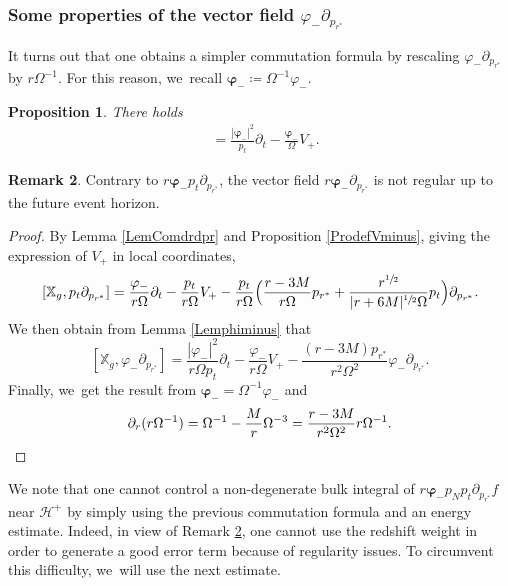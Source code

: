 \documentclass[JEP,XML,SOM,Unicode,published]{cedram}
\theoremstyle{plain}
\newtheorem{proposition}{Proposition}[section]
\theoremstyle{definition}
\newtheorem{remark}[proposition]{Remark}
\newcommand\T{{\mathbb{X}}}
\renewcommand\H{{\mathcal{H}^+}}
\begin{document}
\subsubsection{Some properties of the vector field $\varphi_- \partial_{p_{r^*}}$}

It turns out that one obtains a simpler commutation formula by rescaling $\varphi_- \partial_{p_{r^*}}$ by $r\Omega^{-1}$. For this reason, we~recall $\pmb{\varphi}_-\coloneqq\Omega^{-1} \varphi_-$.

\begin{proposition}\label{Propartialprstar}
There holds
\begin{align*}
[ \T_g, r\pmb{\varphi}_- \partial_{p_{r^*}}]&=\frac{|\pmb{\varphi}_-|^2}{ p_t} \partial_t-\frac{\pmb{\varphi}_-}{\Omega} V_+.
\end{align*}
\end{proposition}
\begin{remark}\label{Rkregu}
Contrary to $r\pmb{\varphi}_- p_t \partial_{p_{r^*}}$, the vector field $r\pmb{\varphi}_- \partial_{p_{r^*}}$ is not regular up to the future event horizon.
\end{remark}

\begin{proof}
By Lemma \ref{LemComdrdpr} and Proposition \ref{ProdefVminus}, giving the expression of $V_+$ in local coordinates,
\[
[ \T_g, p_t\partial_{p_{r^*}}]=\frac{\varphi_-}{r\Omega} \partial_t-\frac{p_t}{r\Omega} V_+-\frac{p_t}{r\Omega}\Bigl(\frac{r-3M}{r\Omega}p_{r^*}+\frac{r^{\sfrac{1}{2}}}{|r+6M|^{\sfrac{1}{2}} \Omega}p_t \Bigr) \partial_{p_{r^*}}.
\]
We then obtain from Lemma \ref{Lemphiminus} that\vspace*{-3pt}
\[
[ \T_g,\varphi_- \partial_{p_{r^*}}]=\frac{|\varphi_-|^2}{r\Omega p_t} \partial_t-\frac{\varphi_-}{r\Omega} V_+-\frac{(r-3M)p_{r^*}}{r^2\Omega^2}\varphi_- \partial_{p_{r^*}}.
\]
Finally, we~get the result from $\pmb{\varphi}_-=\Omega^{-1}\varphi_-$ and\vspace*{-3pt}
\[
\partial_{r}(r\Omega^{-1})=\Omega^{-1}-\frac{M}{r}\Omega^{-3}=\frac{r-3M}{r^2 \Omega^2}r\Omega^{-1}.\qedhere
\]
\end{proof}

We note that one cannot control a non-degenerate bulk integral of $r\pmb{\varphi}_- p_N p_t\partial_{p_{r^*}}f$ near $\H$ by simply using the previous commutation formula and an energy estimate. Indeed, in view of Remark \ref{Rkregu}, one cannot use the redshift weight in order to generate a good error term because of regularity issues. To circumvent this difficulty, we~will use the next estimate.
\end{document}
